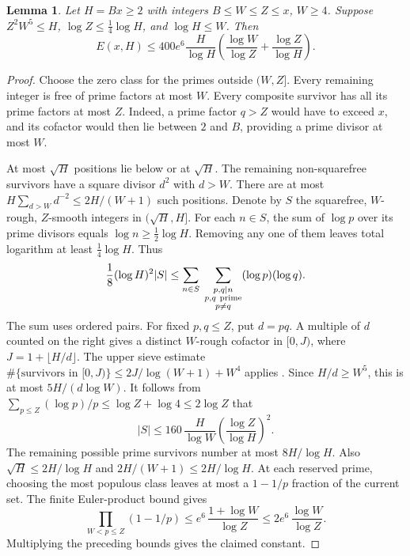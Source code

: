 \documentclass[11pt]{article}
\newtheorem{lemma}[theorem]{Lemma}
\newcommand{\holes}{E}
\begin{document}
\begin{lemma}\label{lem:finite}
Let \(H=Bx\ge2\) with integers \(B\le W\le Z\le x\), \(W\ge4\).
Suppose \(Z^2W^5\le H\), \(\log Z\le\frac14\log H\), and \(\log H\le W\).
Then
\[
  \holes(x,H)\le 400e^6\frac H{\log H}
       \left(\frac{\log W}{\log Z}+\frac{\log Z}{\log H}\right).
\]
\end{lemma}

\begin{proof}
Choose the zero class for the primes outside \((W,Z]\). Every remaining
integer is free of prime factors at most \(W\). Every composite survivor
has all its prime factors at most \(Z\). Indeed, a prime factor \(q>Z\)
would have to exceed \(x\), and its cofactor would then lie between
\(2\) and \(B\), providing a prime divisor at most \(W\).

At most \(\sqrt H\) positions lie below or at \(\sqrt H\). The remaining
non-squarefree survivors have a square divisor \(d^2\) with \(d>W\).
There are at most \(H\sum_{d>W}d^{-2}\le 2H/(W+1)\) such positions.
Denote by \(S\) the squarefree, \(W\)-rough, \(Z\)-smooth integers in
\((\sqrt H,H]\). For each \(n\in S\), the sum of \(\log p\) over its
prime divisors equals \(\log n\ge\frac12\log H\). Removing any one of
them leaves total logarithm at least \(\frac14\log H\). Thus
\[
 \frac18(\log H)^2 |S|
 \le \sum_{n\in S}\;\sum_{\substack{p,q\mid n\\p,q\ {\rm prime}\\p\ne q}}
                      (\log p)(\log q).
\]
The sum uses ordered pairs. For fixed \(p,q\le Z\), put \(d=pq\). A
multiple of \(d\) counted on the right gives a distinct \(W\)-rough
cofactor in \([0,J)\), where \(J=1+\lfloor H/d\rfloor\). The upper sieve
estimate \(\#\{\text{survivors in }[0,J)\}\le
2J/\log(W+1)+W^4\) applies \cite{sieve}. Since \(H/d\ge W^5\), this is
at most \(5H/(d\log W)\). It follows from
\(\sum_{p\le Z}(\log p)/p\le\log Z+\log4\le2\log Z\) that
\[
 |S|\le 160\,\frac H{\log W}
                     \left(\frac{\log Z}{\log H}\right)^2.
\]
The remaining possible prime survivors number at most \(8H/\log H\).
Also \(\sqrt H\le2H/\log H\) and \(2H/(W+1)\le2H/\log H\).
At each reserved prime, choosing the most populous class leaves at most
a \(1-1/p\) fraction of the current set. The finite Euler-product
bound \cite{longgaps} gives
\[
 \prod_{W<p\le Z}(1-1/p)\le e^6\,\frac{1+\log W}{\log Z}
                           \le 2e^6\,\frac{\log W}{\log Z}.
\]
Multiplying the preceding bounds gives the claimed constant.
\end{proof}
\end{document}
